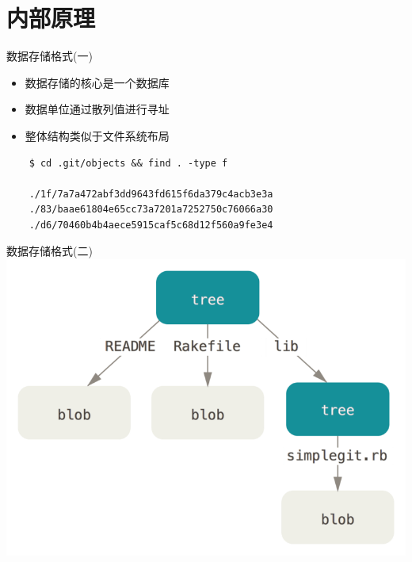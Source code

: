 \section{内部原理}

\begin{frame}[fragile]{数据存储格式(一)}
    \begin{itemize}
        \item 数据存储的核心是一个数据库
        \item 数据单位通过散列值进行寻址
        \item 整体结构类似于文件系统布局
    \end{itemize}

    \begin{lstlisting}
    $ cd .git/objects && find . -type f

    ./1f/7a7a472abf3dd9643fd615f6da379c4acb3e3a
    ./83/baae61804e65cc73a7201a7252750c76066a30
    ./d6/70460b4b4aece5915caf5c68d12f560a9fe3e4
    \end{lstlisting}
\end{frame}

\begin{frame}{数据存储格式(二)}
    \centering
    \includegraphics[scale=0.32]{figures/data-model-1.png}
\end{frame}

